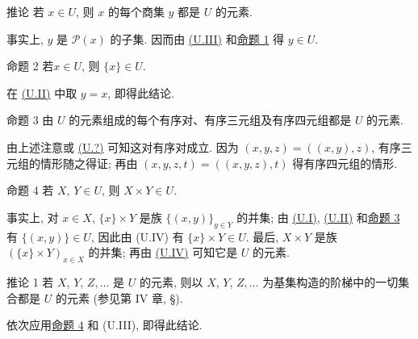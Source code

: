 \hypertarget{sga4.exp.I.appendix.II.sec.1.corollary.to.proposition.1}{}
\begin{enonce*}{推论}
若 $x\in U$, 则 $x$ 的每个商集 $y$ 都是 $U$ 的元素.
\end{enonce*}
事实上, $y$ 是 $\mathcal{P}(x)$ 的子集. 因而由 \hyperlink{sga4.exp.I.appendix.II.sec.1.definition.1.condition.U.III}{(U.III)} 和\hyperlink{sga4.exp.I.appendix.II.sec.1.proposition.1}{命题 1} 得 $y\in U$.

\hypertarget{sga4.exp.I.appendix.II.sec.1.proposition.2}{}
\begin{enonce*}{命题 2}
若\pageoriginale $x\in U$, 则 $\{x\}\in U$.
\end{enonce*}
在 \hyperlink{sga4.exp.I.appendix.II.sec.1.definition.1.condition.U.II}{(U.II)} 中取 $y=x$, 即得此结论.

\hypertarget{sga4.exp.I.appendix.II.sec.1.proposition.3}{}
\begin{enonce*}{命题 3}
由 $U$ 的元素组成的每个有序对、有序三元组及有序四元组都是 $U$ 的元素.
\end{enonce*}
由上述注意或 \hyperlink{sga4.exp.I.appendix.II.sec.1.definition.1.condition.U.question}{(U.?)} 可知这对有序对成立. 因为 $(x,y,z)=((x,y),z)$, 有序三元组的情形随之得证; 再由 $(x,y,z,t)=((x,y,z),t)$ 得有序四元组的情形.

\hypertarget{sga4.exp.I.appendix.II.sec.1.proposition.4}{}
\begin{enonce*}{命题 4}
若 $X$, $Y\in U$, 则 $X\times Y\in U$.
\end{enonce*}
事实上, 对 $x\in X$, $\{x\}\times Y$ 是族 $\{(x,y)\}_{y\in Y}$ 的并集; 由 \hyperlink{sga4.exp.I.appendix.II.sec.1.definition.1.condition.U.I}{(U.I)}, \hyperlink{sga4.exp.I.appendix.II.sec.1.definition.1.condition.U.II}{(U.II)} 和\hyperlink{sga4.exp.I.appendix.II.sec.1.proposition.3}{命题 3} 有 $\{(x,y)\}\in U$, 因此由 (U.IV) 有 $\{x\}\times Y\in U$. 最后, $X\times Y$ 是族 $(\{x\}\times Y)_{x\in X}$ 的并集; 再由 \hyperlink{sga4.exp.I.appendix.II.sec.1.definition.1.condition.U.IV}{(U.IV)} 可知它是 $U$ 的元素.

\hypertarget{sga4.exp.I.appendix.II.sec.1.corollary.to.proposition.4.1}{}
\begin{enonce*}{推论 1}
若 $X$, $Y$, $Z,\ldots$ 是 $U$ 的元素, 则以 $X$, $Y$, $Z,\ldots$ 为基集构造的阶梯中的一切集合都是 $U$ 的元素 {\rm(参见第 IV 章, \S)}.
\end{enonce*}

依次应用\hyperlink{sga4.exp.I.appendix.II.sec.1.proposition.4}{命题 4} 和 (U.III), 即得此结论.

